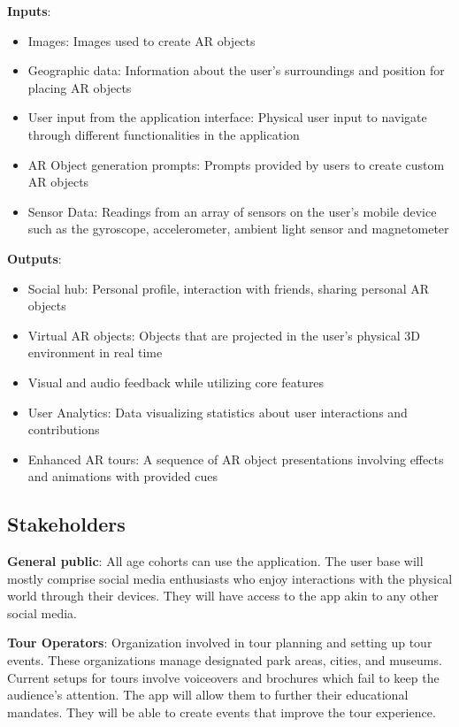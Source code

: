 \documentclass{article}
\begin{document}
\textbf{Inputs}:
\begin{itemize}
  \item Images: Images used to create AR objects
  \item Geographic data: Information about the user’s surroundings and position for placing AR objects
  \item User input from the application interface: Physical user input to navigate through different functionalities in the application
  \item AR Object generation prompts: Prompts provided by users to create custom AR objects
  \item Sensor Data: Readings from an array of sensors on the user’s mobile device such as the gyroscope, accelerometer, ambient light sensor and magnetometer
\end{itemize}

\begin{flushleft}
\textbf{Outputs}:
\end{flushleft}
\begin{itemize}
  \item Social hub: Personal profile, interaction with friends, sharing personal AR objects
  \item Virtual AR objects: Objects that are projected in the user’s physical 3D environment in real time
  \item Visual and audio feedback while utilizing core features
  \item User Analytics: Data visualizing statistics about user interactions and contributions
  \item Enhanced AR tours: A sequence of AR object presentations involving effects and animations with provided cues
\end{itemize}

\subsection{Stakeholders}

\begin{flushleft}
 \textbf{General public}: All age cohorts can use the application. The user base will mostly comprise social media enthusiasts who enjoy interactions with the physical world through their devices. They will have access to the app akin to any other social media.\linebreak

 \textbf{Tour Operators}: Organization involved in tour planning and setting up tour events. These organizations manage designated park areas, cities, and museums. Current setups for tours involve voiceovers and brochures which fail to keep the audience’s attention. The app will allow them to further their educational mandates. They will be able to create events that improve the tour experience.
\end{flushleft}
\end{document}
